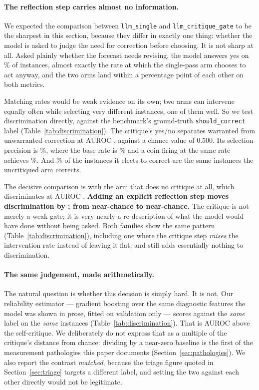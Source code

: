 \paragraph{The reflection step carries almost no information.}
We expected the comparison between \texttt{llm\_single} and \texttt{llm\_critique\_gate}
to be the sharpest in this section, because they differ in exactly one thing: whether the
model is asked to judge the need for correction before choosing. It is not sharp at all.
Asked plainly whether the forecast needs revising, the model answers yes on
\rateLlmCritiqueGate\% of instances, almost exactly the rate at which the single-pass arm
chooses to act anyway, and the two arms land within a percentage point of each other on
both metrics.

Matching rates would be weak evidence on its own; two arms can intervene equally often
while selecting very different instances, one of them well. So we test discrimination
directly, against the benchmark's ground-truth \texttt{should\_correct} label
(Table~\ref{tab:discrimination}). The critique's yes/no separates warranted from
unwarranted correction at AUROC \discrimAurocCritique{}, against a chance value of 0.500.
Its selection precision is \discrimPrecisionCritique\%, where the base rate is
\discrimBaseRate\% and a coin firing at the same rate achieves \discrimPrecisionRandom\%.
And \discrimJaccard\% of the instances it elects to correct are the same instances the
uncritiqued arm corrects.

The decisive comparison is with the arm that does no critique at all, which discriminates
at AUROC \discrimAurocSingle{}. \textbf{Adding an explicit reflection step moves
discrimination by \discrimAurocDelta{}; from near-chance to near-chance.} The critique
is not merely a weak gate; it is very nearly a re-description of what the model would have
done without being asked. Both families show the same pattern
(Table~\ref{tab:discrimination}), including one where the critique step \emph{raises} the
intervention rate instead of leaving it flat, and still adds essentially nothing to
discrimination.

\paragraph{The same judgement, made arithmetically.}
The natural question is whether this decision is simply hard. It is not. Our reliability
estimator --- gradient boosting over the same diagnostic features the model was shown in
prose, fitted on validation only --- scores \discrimAurocArithmetic{} against the
\emph{same} label on the \emph{same} instances (Table~\ref{tab:discrimination}). That is
\discrimArithmeticAdvantage{} AUROC above the self-critique. We deliberately do not
express that as a multiple of the critique's distance from chance: dividing by a
near-zero baseline is the first of the measurement pathologies this paper documents
(Section~\ref{sec:pathologies}). We also
report the contrast \emph{matched}, because the triage figure quoted in
Section~\ref{sec:triage} targets a different label, and setting the two against each
other directly would not be legitimate.

